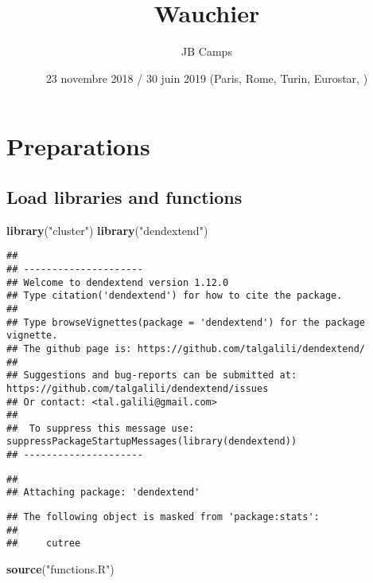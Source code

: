 \documentclass[]{article}
\title{Wauchier}
\author{JB Camps}
\date{23 novembre 2018 / 30 juin 2019 (Paris, Rome, Turin, Eurostar, )}
\newenvironment{Shaded}{\begin{snugshade}}{\end{snugshade}}
\newcommand{\KeywordTok}[1]{\textcolor[rgb]{0.13,0.29,0.53}{\textbf{#1}}}
\newcommand{\NormalTok}[1]{#1}
\newcommand{\StringTok}[1]{\textcolor[rgb]{0.31,0.60,0.02}{#1}}
\begin{document}
\maketitle

\hypertarget{preparations}{%
\section{Preparations}\label{preparations}}

\hypertarget{load-libraries-and-functions}{%
\subsection{Load libraries and
functions}\label{load-libraries-and-functions}}

\begin{Shaded}
\begin{Highlighting}[]
\KeywordTok{library}\NormalTok{(}\StringTok{"cluster"}\NormalTok{)}
\KeywordTok{library}\NormalTok{(}\StringTok{"dendextend"}\NormalTok{)}
\end{Highlighting}
\end{Shaded}

\begin{verbatim}
## 
## ---------------------
## Welcome to dendextend version 1.12.0
## Type citation('dendextend') for how to cite the package.
## 
## Type browseVignettes(package = 'dendextend') for the package vignette.
## The github page is: https://github.com/talgalili/dendextend/
## 
## Suggestions and bug-reports can be submitted at: https://github.com/talgalili/dendextend/issues
## Or contact: <tal.galili@gmail.com>
## 
##  To suppress this message use:  suppressPackageStartupMessages(library(dendextend))
## ---------------------
\end{verbatim}

\begin{verbatim}
## 
## Attaching package: 'dendextend'
\end{verbatim}

\begin{verbatim}
## The following object is masked from 'package:stats':
## 
##     cutree
\end{verbatim}

\begin{Shaded}
\begin{Highlighting}[]
\KeywordTok{source}\NormalTok{(}\StringTok{"functions.R"}\NormalTok{)}
\end{Highlighting}
\end{Shaded}
\end{document}
